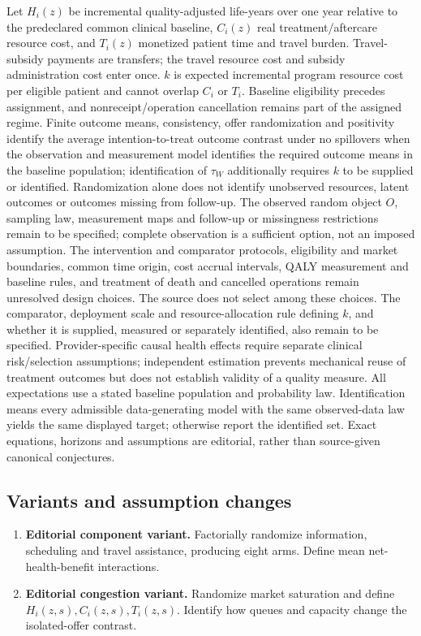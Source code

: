 \documentclass[11pt,a4paper]{article}
\begin{document}
Let \(H_i(z)\) be incremental quality-adjusted life-years over one year relative to the predeclared common clinical baseline, \(C_i(z)\) real treatment/aftercare resource cost, and \(T_i(z)\) monetized patient time and travel burden. Travel-subsidy payments are transfers; the travel resource cost and subsidy administration cost enter once. \(k\) is expected incremental program resource cost per eligible patient and cannot overlap \(C_i\) or \(T_i\). Baseline eligibility precedes assignment, and nonreceipt/operation cancellation remains part of the assigned regime. Finite outcome means, consistency, offer randomization and positivity identify the average intention-to-treat outcome contrast under no spillovers when the observation and measurement model identifies the required outcome means in the baseline population; identification of \(\tau_W\) additionally requires \(k\) to be supplied or identified. Randomization alone does not identify unobserved resources, latent outcomes or outcomes missing from follow-up. The observed random object \(O\), sampling law, measurement maps and follow-up or missingness restrictions remain to be specified; complete observation is a sufficient option, not an imposed assumption. The intervention and comparator protocols, eligibility and market boundaries, common time origin, cost accrual intervals, QALY measurement and baseline rules, and treatment of death and cancelled operations remain unresolved design choices. The source does not select among these choices. The comparator, deployment scale and resource-allocation rule defining \(k\), and whether it is supplied, measured or separately identified, also remain to be specified. Provider-specific causal health effects require separate clinical risk/selection assumptions; independent estimation prevents mechanical reuse of treatment outcomes but does not establish validity of a quality measure. All expectations use a stated baseline population and probability law. Identification means every admissible data-generating model with the same observed-data law yields the same displayed target; otherwise report the identified set. Exact equations, horizons and assumptions are editorial, rather than source-given canonical conjectures.
\subsection*{Variants and assumption changes}
\begin{enumerate}
\item \textbf{Editorial component variant.} Factorially randomize information, scheduling and travel assistance, producing eight arms. Define mean net-health-benefit interactions.
\item \textbf{Editorial congestion variant.} Randomize market saturation and define \(H_i(z,s),\allowbreak C_i(z,s),\allowbreak T_i(z,s)\). Identify how queues and capacity change the isolated-offer contrast.
\end{enumerate}
\end{document}
